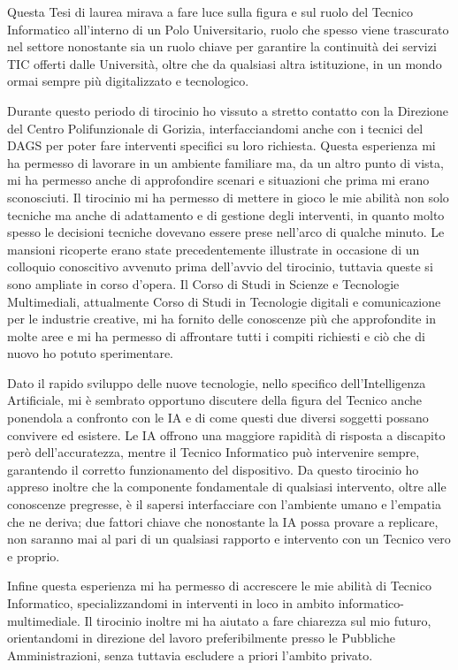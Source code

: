 \conclusions\label{ch:concl}
    \par
        Questa Tesi di laurea mirava a fare luce sulla figura e sul ruolo del Tecnico Informatico all'interno di un Polo Universitario, ruolo che spesso viene trascurato nel settore nonostante sia un ruolo chiave per garantire la continuità dei servizi TIC offerti dalle Università, oltre che da qualsiasi altra istituzione, in un mondo ormai sempre più digitalizzato e tecnologico. 
    \par
        Durante questo periodo di tirocinio ho vissuto a stretto contatto con la Direzione del Centro Polifunzionale di Gorizia, interfacciandomi anche con i tecnici del DAGS per poter fare interventi specifici su loro richiesta. Questa esperienza mi ha permesso di lavorare in un ambiente familiare ma, da un altro punto di vista, mi ha permesso anche di approfondire scenari e situazioni che prima mi erano sconosciuti. Il tirocinio mi ha permesso di mettere in gioco le mie abilità non solo tecniche ma anche di adattamento e di gestione degli interventi, in quanto molto spesso le decisioni tecniche dovevano essere prese nell'arco di qualche minuto. \newline
        Le mansioni ricoperte erano state precedentemente illustrate in occasione di un colloquio conoscitivo avvenuto prima dell'avvio del tirocinio, tuttavia queste si sono ampliate in corso d'opera. Il Corso di Studi in Scienze e Tecnologie Multimediali, attualmente Corso di Studi in Tecnologie digitali e comunicazione per le industrie creative, mi ha fornito delle conoscenze più che approfondite in molte aree e mi ha permesso di affrontare tutti i compiti richiesti e ciò che di nuovo ho potuto sperimentare. 
    \par
        Dato il rapido sviluppo delle nuove tecnologie, nello specifico dell'Intelligenza Artificiale, mi è sembrato opportuno discutere della figura del Tecnico anche ponendola a confronto con le IA e di come questi due diversi soggetti possano convivere ed esistere. Le IA offrono una maggiore rapidità di risposta a discapito però dell'accuratezza, mentre il Tecnico Informatico può intervenire sempre, garantendo il corretto funzionamento del dispositivo. 
        Da questo tirocinio ho appreso inoltre che la componente fondamentale di qualsiasi intervento, oltre alle conoscenze pregresse, è il sapersi interfacciare con l'ambiente umano e l'empatia che ne deriva; due fattori chiave che nonostante la IA possa provare a replicare, non saranno mai al pari di un qualsiasi rapporto e intervento con un Tecnico vero e proprio. 
    \par
        Infine questa esperienza mi ha permesso di accrescere le mie abilità di Tecnico Informatico, specializzandomi in interventi in loco in ambito informatico-multimediale. Il tirocinio inoltre mi ha aiutato a fare chiarezza sul mio futuro, orientandomi in direzione del lavoro preferibilmente presso le Pubbliche Amministrazioni, senza tuttavia escludere a priori l'ambito privato.